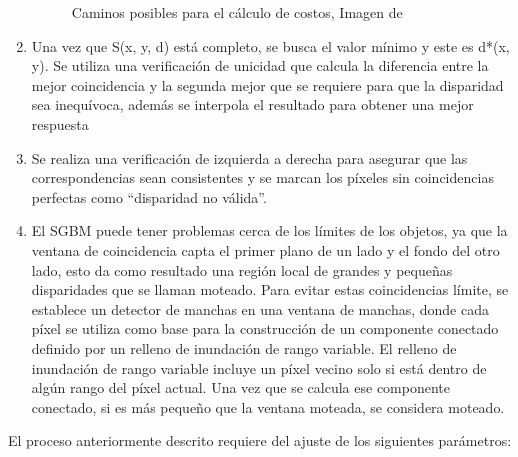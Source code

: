 \begin{enumerate}
\begin{figure}[H]
        \caption{Caminos posibles para el cálculo de costos, Imagen de \cite{LearningOpenCV3}}
        \label{cost_directions}
    \end{figure}
    \item Una vez que S(x, y, d) está completo, se busca el valor mínimo y este es d*(x, y). Se utiliza una verificación de unicidad que calcula la diferencia entre la mejor coincidencia y la segunda mejor que se requiere para que la disparidad sea inequívoca, además se interpola el resultado para obtener una mejor respuesta
    \item Se realiza una verificación de izquierda a derecha para asegurar que las correspondencias sean consistentes y se marcan los píxeles sin coincidencias perfectas como ``disparidad no válida''.
    \item El SGBM puede tener problemas cerca de los límites de los objetos, ya que la ventana de coincidencia capta el primer plano de un lado y el fondo del otro lado, esto da como resultado una región local de grandes y pequeñas disparidades que se llaman moteado. Para evitar estas coincidencias límite, se establece un detector de manchas en una ventana de manchas, donde cada píxel se utiliza como base para la construcción de un componente conectado definido por un relleno de inundación de rango variable. El relleno de inundación de rango variable incluye un píxel vecino solo si está dentro de algún rango del píxel actual. Una vez que se calcula ese componente conectado, si es más pequeño que la ventana moteada, se considera moteado.
\end{enumerate}
El proceso anteriormente descrito requiere del ajuste de los siguientes parámetros:
